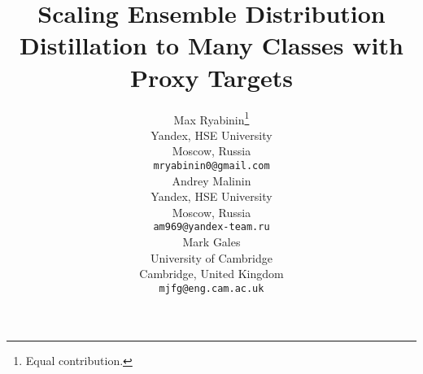 \documentclass{article}
\title{Scaling Ensemble Distribution Distillation to Many Classes with Proxy Targets}
\author{%
  Max Ryabinin\thanks{Equal contribution.} \\
  Yandex, HSE University\\
  Moscow, Russia \\
  \texttt{mryabinin0@gmail.com} \\
  \And 
   Andrey Malinin
   \footnotemark[1] \\
   Yandex, HSE University \\
   Moscow, Russia \\
   \texttt{am969@yandex-team.ru} \\
  \And
   Mark Gales \\
   University of Cambridge \\
   Cambridge, United Kingdom \\
   \texttt{mjfg@eng.cam.ac.uk} \\
}
\begin{document}
\maketitle

\begin{abstract}
    
\end{abstract}













\end{document}
